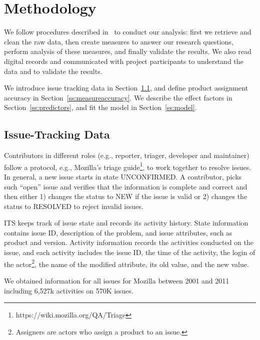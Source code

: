 \documentclass{sig-alternate}
\begin{document}
\section{Methodology}\label{s:method}
We follow procedures described in~\cite{Changes07} to conduct
our analysis: first we retrieve and clean the raw data,
then create measures to answer our
research questions, perform analysis of these measures, and finally
validate the results. We also read digital
records and communicated with project participants to
understand the data and to validate the results.

We introduce issue tracking data in Section~\ref{ss:data},
and define product assignment
accuracy in Section~\ref{ss:measureaccuracy}.
We describe the effect factors in Section~\ref{ss:predictors}, and fit the
model in Section~\ref{ss:model}.

\vspace{-.2cm}
\subsection{Issue-Tracking Data}\label{ss:data}
Contributors in different roles (e.g., reporter, triager, developer
and maintainer) follow a protocol, e.g., Mozilla's triage
guide\footnote{https://wiki.mozilla.org/QA/Triage},
to work together to resolve issues.
In general, a new issue starts in state UNCONFIRMED. A
contributor, picks such ``open'' issue and verifies that
the information is complete and correct and then either
1) changes the status to NEW if the issue is valid or
2) changes the status to RESOLVED to reject invalid issues.

ITS keeps track of issue state and records its activity
history. State information contains issue ID, description of the
problem, and issue attributes, such as product and version. Activity
information records the activities conducted on the issue, and each
activity includes the issue ID, the time of the activity, the login
of the actor\footnote{Assigners are actors who assign a product to
  an issue.}, the name of the modified attribute, its old value, and
the new value.

We obtained information for all issues for Mozilla between 2001 and 2011
including 6,527k activities on 570K issues. %
\end{document}
